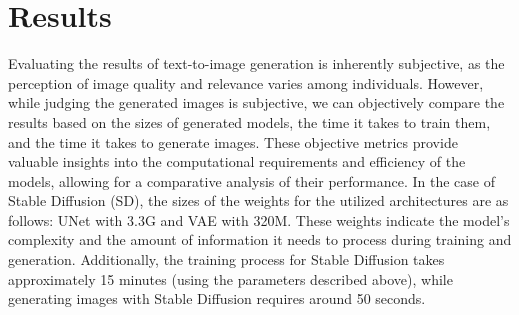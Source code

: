 \documentclass[conference]{IEEEtran}
\begin{document}







\section{Results}
Evaluating the results of text-to-image generation is inherently subjective, as the perception of image quality and relevance varies among individuals. However, while judging the generated images is subjective, we can objectively compare the results based on the sizes of generated models, the time it takes to train them, and the time it takes to generate images. These objective metrics provide valuable insights into the computational requirements and efficiency of the models, allowing for a comparative analysis of their performance.
In the case of Stable Diffusion (SD), the sizes of the weights for the utilized architectures are as follows: UNet with 3.3G and VAE with 320M. These weights indicate the model's complexity and the amount of information it needs to process during training and generation. Additionally, the training process for Stable Diffusion takes approximately 15 minutes (using the parameters described above), while generating images with Stable Diffusion requires around 50 seconds.
\end{document}

